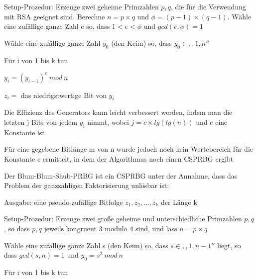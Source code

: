 \documentclass[a4paper]{article}
\begin{document}
\begin{multicols}{3}
\begin{itemize*}
\begin{itemize*}
            \end{itemize*}
            \begin{enumerate*}
                  \item Setup-Prozedur: Erzeuge zwei geheime Primzahlen $p, q$, die für die Verwendung mit RSA geeignet sind. Berechne $n=p\times q$ und $\phi=(p-1)\times(q-1)$. Wähle eine zufällige ganze Zahl e so, dass $1< e<\phi$ und $gcd(e,\phi)=1$
                  \item Wähle eine zufällige ganze Zahl $y_0$ (den Keim) so, dass $y_0\in ,,1,n''$
                  \item Für i von 1 bis k tun
                  \begin{enumerate*}
                        \item $y_i=(y_{i-1})^e\ mod\ n$
                        \item $z_i =$ das niedrigstwertige Bit von $y_i$
                  \end{enumerate*}
            \end{enumerate*}
            \begin{itemize*}
                  \item Die Effizienz des Generators kann leicht verbessert werden, indem man die letzten j Bits von jedem $y_i$ nimmt, wobei $j=c\times lg(lg(n))$ und c eine Konstante ist
                  \item Für eine gegebene Bitlänge m von n wurde jedoch noch kein Wertebereich für die Konstante c ermittelt, in dem der Algorithmus noch einen CSPRBG ergibt
            \end{itemize*}
            \item Der Blum-Blum-Shub-PRBG ist ein CSPRBG unter der Annahme, dass das Problem der ganzzahligen Faktorisierung unlösbar ist:
            \begin{itemize*}
                  \item Ausgabe: eine pseudo-zufällige Bitfolge $z_1,z_2,...,z_k$ der Länge k
            \end{itemize*}
            \begin{enumerate*}
                  \item Setup-Prozedur: Erzeuge zwei große geheime und unterschiedliche Primzahlen $p,q$, so dass $p,q$ jeweils kongruent 3 modulo 4 sind, und lass $n=p\times q$
                  \item Wähle eine zufällige ganze Zahl s (den Keim) so, dass $s\in ,,1, n-1''$ liegt, so dass $gcd(s,n)=1$ und $y_0=s^2\ mod\ n$
                  \item Für i von 1 bis k tun

\end{enumerate*}
\end{itemize*}
\end{multicols}
\end{document}
